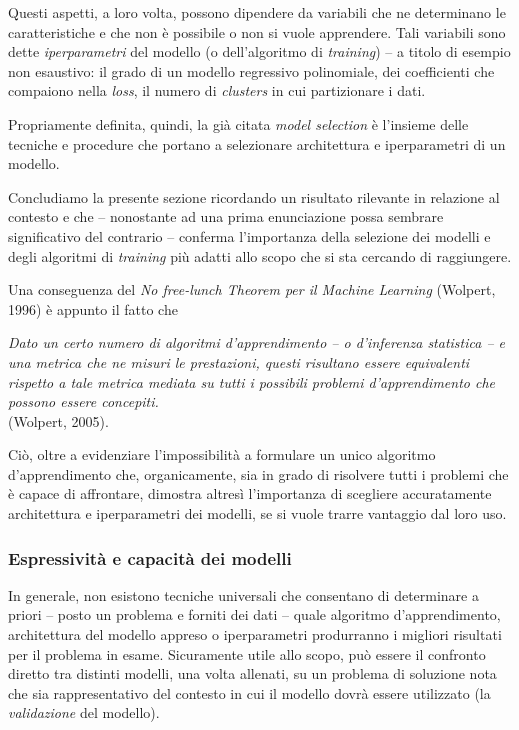 \documentclass[a4paper, twoside]{article}
\begin{document}
Questi aspetti, a loro volta, possono dipendere da variabili che ne determinano le caratteristiche e che non è possibile o non si vuole apprendere. Tali variabili sono dette \textit{iperparametri} del modello (o dell'algoritmo di \textit{training}) -- a titolo di esempio non esaustivo: il grado di un modello regressivo polinomiale, dei coefficienti che compaiono nella \textit{loss}, il numero di \textit{clusters} in cui partizionare i dati.

Propriamente definita, quindi, la già citata \textit{model selection} è l'insieme delle tecniche e procedure che portano a selezionare architettura e iperparametri di un modello.

Concludiamo la presente sezione ricordando un risultato rilevante in relazione al contesto e che -- nonostante ad una prima enunciazione possa sembrare significativo del contrario -- conferma l'importanza della selezione dei modelli e degli algoritmi di \textit{training} più adatti allo scopo che si sta cercando di raggiungere.

Una conseguenza del \textit{No free-lunch Theorem per il Machine Learning} (Wolpert, 1996) è appunto il fatto che

\begin{displayquote}
	\textit{Dato un certo numero di algoritmi d'apprendimento -- o d'inferenza statistica -- e una metrica che ne misuri le prestazioni, questi risultano essere equivalenti rispetto a tale metrica mediata su tutti i possibili problemi d'apprendimento che possono essere concepiti.} \\(Wolpert, 2005).
\end{displayquote}

Ciò, oltre a evidenziare l'impossibilità a formulare un unico algoritmo d'apprendimento che, organicamente, sia in grado di risolvere tutti i problemi che è capace di affrontare, dimostra altresì l'importanza di scegliere accuratamente architettura e iperparametri dei modelli, se si vuole trarre vantaggio dal loro uso.


\subsubsection{Espressività e capacità dei modelli}

In generale, non esistono tecniche universali che consentano di determinare a priori -- posto un problema e forniti dei dati -- quale algoritmo d'apprendimento, architettura del modello appreso o iperparametri produrranno i migliori risultati per il problema in esame. Sicuramente utile allo scopo, può essere il confronto diretto tra distinti modelli, una volta allenati, su un problema di soluzione nota che sia rappresentativo del contesto in cui il modello dovrà essere utilizzato (la \textit{validazione} del modello).
\end{document}
